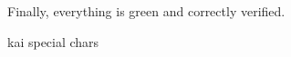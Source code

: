 \documentclass[runningheads]{llncs}
\newcommand{\todo}[1]{{\par \color{red}#1}}
\begin{document}
Finally, everything is green and correctly verified. \todo{kai special chars}
\end{document}
